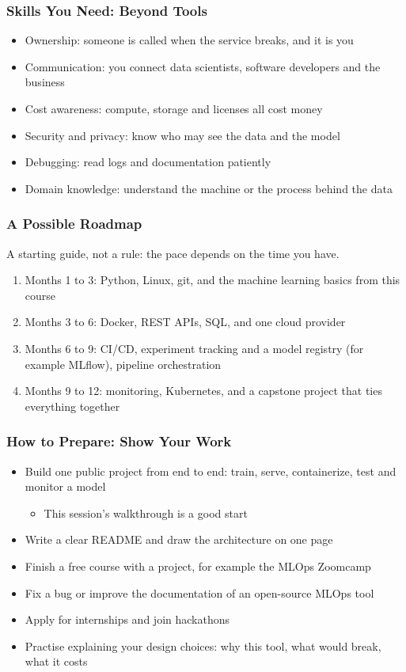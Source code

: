 \begin{frame}[fragile]\frametitle{Skills You Need: Beyond Tools}
\begin{itemize}
\item Ownership: someone is called when the service breaks, and it is you
\item Communication: you connect data scientists, software developers and the business
\item Cost awareness: compute, storage and licenses all cost money
\item Security and privacy: know who may see the data and the model
\item Debugging: read logs and documentation patiently
\item Domain knowledge: understand the machine or the process behind the data
\end{itemize}
\end{frame}

\begin{frame}[fragile]\frametitle{A Possible Roadmap}
A starting guide, not a rule: the pace depends on the time you have.
\begin{enumerate}
\item Months 1 to 3: Python, Linux, git, and the machine learning basics from this course
\item Months 3 to 6: Docker, REST APIs, SQL, and one cloud provider
\item Months 6 to 9: CI/CD, experiment tracking and a model registry (for example MLflow), pipeline orchestration
\item Months 9 to 12: monitoring, Kubernetes, and a capstone project that ties everything together
\end{enumerate}
\end{frame}

\begin{frame}[fragile]\frametitle{How to Prepare: Show Your Work}
\begin{itemize}
\item Build one public project from end to end: train, serve, containerize, test and monitor a model
\begin{itemize}
\item This session's walkthrough is a good start
\end{itemize}
\item Write a clear README and draw the architecture on one page
\item Finish a free course with a project, for example the MLOps Zoomcamp
\item Fix a bug or improve the documentation of an open-source MLOps tool
\item Apply for internships and join hackathons
\item Practise explaining your design choices: why this tool, what would break, what it costs
\end{itemize}
\end{frame}

